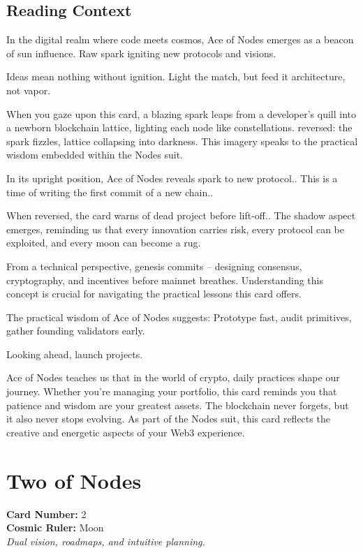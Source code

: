 \documentclass[11pt,oneside]{book}
\begin{document}
\begin{minipage}[t]{0.55\textwidth}
  \subsection*{Reading Context}
  In the digital realm where code meets cosmos, Ace of Nodes emerges as a beacon of sun influence. Raw spark igniting new protocols and visions.

  Ideas mean nothing without ignition. Light the match, but feed it architecture, not vapor.

  When you gaze upon this card, a blazing spark leaps from a developer's quill into a newborn blockchain lattice, lighting each node like constellations. reversed: the spark fizzles, lattice collapsing into darkness. This imagery speaks to the practical wisdom embedded within the Nodes suit.

  In its upright position, Ace of Nodes reveals spark to new protocol.. This is a time of writing the first commit of a new chain..

  When reversed, the card warns of dead project before lift-off.. The shadow aspect emerges, reminding us that every innovation carries risk, every protocol can be exploited, and every moon can become a rug.

  From a technical perspective, genesis commits – designing consensus, cryptography, and incentives before mainnet breathes. Understanding this concept is crucial for navigating the practical lessons this card offers.

  The practical wisdom of Ace of Nodes suggests: Prototype fast, audit primitives, gather founding validators early.

  Looking ahead, launch projects.

  Ace of Nodes teaches us that in the world of crypto, daily practices shape our journey. Whether you're managing your portfolio, this card reminds you that patience and wisdom are your greatest assets. The blockchain never forgets, but it also never stops evolving. As part of the Nodes suit, this card reflects the creative and energetic aspects of your Web3 experience.

\end{minipage}

\newpage
\section*{Two of Nodes}

\begin{minipage}[t]{0.55\textwidth}
  \vspace{0pt}
  \textbf{Card Number:} 2\\  \textbf{Cosmic Ruler:} Moon\\  \textit{Dual vision, roadmaps, and intuitive planning.}
\end{minipage}
\end{document}
